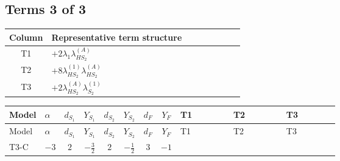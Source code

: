 \documentclass[8pt]{article}
\begin{document}
\begin{landscape}
\subsection*{Terms 3 of 3}
\begin{center}
\begin{tabular}{@{}c >{\raggedright\arraybackslash}p{0.82\linewidth}@{}}
\toprule
Column & Representative term structure \\
\midrule
T1 & \(\displaystyle +2 {\lambda_1} {\lambda_{HS_2}^{(A)}}\) \\
\midrule
T2 & \(\displaystyle +8 {\lambda_{HS_2}^{(1)}} {\lambda_{HS_2}^{(A)}}\) \\
\midrule
T3 & \(\displaystyle +2 {\lambda_{HS_2}^{(A)}} {\lambda_{S_2}^{(1)}}\) \\
\midrule
\bottomrule
\end{tabular}
\end{center}
\smallskip
\tiny
\begin{longtable}{@{}llcccccc >{\raggedright\arraybackslash}p{0.21\linewidth} >{\raggedright\arraybackslash}p{0.21\linewidth} >{\raggedright\arraybackslash}p{0.21\linewidth}@{}}
\toprule
Model & $\alpha$ & $d_{S_1}$ & $Y_{S_1}$ & $d_{S_2}$ & $Y_{S_2}$ & $d_F$ & $Y_F$ & T1 & T2 & T3 \\
\midrule
\endfirsthead
\toprule
Model & $\alpha$ & $d_{S_1}$ & $Y_{S_1}$ & $d_{S_2}$ & $Y_{S_2}$ & $d_F$ & $Y_F$ & T1 & T2 & T3 \\
\midrule
\endhead
T3-C & $-3$ & $2$ & $-\frac{3}{2}$ & $2$ & $-\frac{1}{2}$ & $3$ & $-1$ & \scriptsize\adjustbox{max width=\linewidth}{$\begin{gathered} +2 {\lambda_1} {\lambda_{HS_2}^{(A)}}\end{gathered}$} & \scriptsize\adjustbox{max width=\linewidth}{$\begin{gathered} +8 {\lambda_{HS_2}^{(1)}} {\lambda_{HS_2}^{(A)}}\end{gathered}$} & \scriptsize\adjustbox{max width=\linewidth}{$\begin{gathered} +2 {\lambda_{HS_2}^{(A)}} {\lambda_{S_2}^{(1)}}\end{gathered}$} \\
\midrule
\bottomrule
\end{longtable}
\end{landscape}
\end{document}
